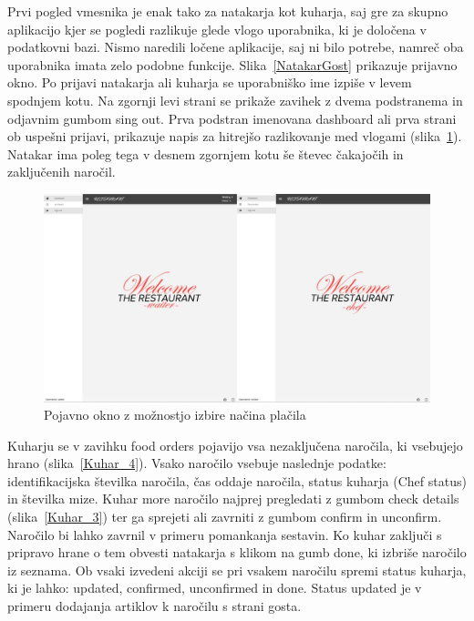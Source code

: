 \documentclass[a4paper, 12pt]{book}
\begin{document}
Prvi pogled vmesnika je enak tako za natakarja kot kuharja, saj gre za skupno aplikacijo kjer se pogledi razlikuje glede vlogo uporabnika, ki je določena v podatkovni bazi. Nismo naredili ločene aplikacije, saj ni bilo potrebe, namreč oba uporabnika imata zelo podobne funkcije. Slika~\ref{NatakarGost} prikazuje prijavno okno. Po prijavi natakarja ali kuharja se uporabniško ime izpiše v levem spodnjem kotu. Na zgornji levi strani se prikaže zavihek z dvema podstranema in odjavnim gumbom sing out. Prva podstran imenovana dashboard ali prva strani ob uspešni prijavi, prikazuje napis za hitrejšo razlikovanje med vlogami (slika~\ref{Dvapogleda}). Natakar ima poleg tega v desnem zgornjem kotu še števec čakajočih in zaključenih naročil.

\begin{figure}[!htb]
\begin{center}
\includegraphics[width=14cm]{dvapogleda.jpg}
\caption{Pojavno okno z možnostjo izbire načina plačila}
\label{Dvapogleda}
\end{center}
\end{figure}

Kuharju se v zavihku food orders pojavijo vsa nezaključena naročila, ki vsebujejo hrano (slika~\ref{Kuhar_4}). Vsako naročilo vsebuje naslednje podatke: identifikacijska številka naročila, čas oddaje naročila, status kuharja (Chef status) in številka mize. Kuhar more naročilo najprej pregledati z gumbom check details (slika~\ref{Kuhar_3}) ter ga sprejeti ali zavrniti z gumbom confirm in unconfirm. Naročilo bi lahko zavrnil v primeru pomankanja sestavin. Ko kuhar zaključi s pripravo hrane o tem obvesti natakarja s klikom na gumb done, ki izbriše naročilo iz seznama. Ob vsaki izvedeni akciji se pri vsakem naročilu spremi status kuharja, ki je lahko: updated, confirmed, unconfirmed in done. Status updated je v primeru dodajanja artiklov k naročilu s strani gosta.
\end{document}
